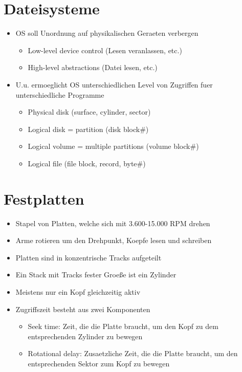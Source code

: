 \documentclass[a4paper]{scrreprt}
\begin{document}
\section{Dateisysteme}
\begin{itemize}
	\item OS soll Unordnung auf physikalischen Geraeten verbergen
		\begin{itemize}
			\item Low-level device control (Lesen veranlassen, etc.)
			\item High-level abstractions (Datei lesen, etc.)
		\end{itemize}
	\item U.u. ermoeglicht OS unterschiedlichen Level von Zugriffen fuer unterschiedliche Programme
		\begin{itemize}
			\item Physical disk (surface, cylinder, sector)
			\item Logical disk = partition (disk block\#)
			\item Logical volume = multiple partitions (volume block\#)
			\item Logical file (file block, record, byte\#)
		\end{itemize}
\end{itemize}

\section{Festplatten}
\begin{itemize}
	\item Stapel von Platten, welche sich mit 3.600-15.000 RPM drehen
	\item Arme rotieren um den Drehpunkt, Koepfe lesen und schreiben
	\item Platten sind in konzentrische Tracks aufgeteilt
	\item Ein Stack mit Tracks fester Groeße ist ein Zylinder
	\item Meistens nur ein Kopf gleichzeitig aktiv
	\item Zugriffszeit besteht aus zwei Komponenten
		\begin{itemize}
			\item Seek time: Zeit, die die Platte braucht, um den Kopf zu dem entsprechenden Zylinder zu bewegen
			\item Rotational delay: Zusaetzliche Zeit, die die Platte braucht, um den entsprechenden Sektor zum Kopf zu bewegen
		\end{itemize}
\end{itemize}
\end{document}
